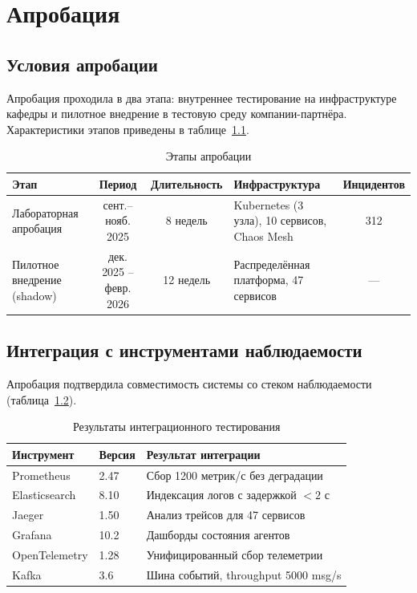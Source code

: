 \chapter{Апробация}

\section{Условия апробации}

Апробация проходила в два этапа: внутреннее тестирование на инфраструктуре кафедры и пилотное внедрение в тестовую среду компании-партнёра. Характеристики этапов приведены в таблице~\ref{tab:aprobation_stages}.

\begin{table}[H]
\centering
\caption{Этапы апробации}
\label{tab:aprobation_stages}
\begin{tabular}{|p{4cm}|c|c|p{5.5cm}|c|}
\hline
\textbf{Этап} & \textbf{Период} & \textbf{Длительность} & \textbf{Инфраструктура} & \textbf{Инцидентов} \\
\hline
Лабораторная апробация & сент.--нояб. 2025 & 8 недель & Kubernetes (3 узла), 10 сервисов, Chaos Mesh & 312 \\
\hline
Пилотное внедрение (shadow) & дек. 2025 -- февр. 2026 & 12 недель & Распределённая платформа, 47 сервисов & --- \\
\hline
\end{tabular}
\end{table}

\section{Интеграция с инструментами наблюдаемости}

Апробация подтвердила совместимость системы со стеком наблюдаемости (таблица~\ref{tab:integration_results}).

\begin{table}[H]
\centering
\caption{Результаты интеграционного тестирования}
\label{tab:integration_results}
\begin{tabular}{|p{3.5cm}|p{4cm}|p{5cm}|}
\hline
\textbf{Инструмент} & \textbf{Версия} & \textbf{Результат интеграции} \\
\hline
Prometheus & 2.47 & Сбор 1200 метрик/с без деградации \\
\hline
Elasticsearch & 8.10 & Индексация логов с задержкой $< 2$ с \\
\hline
Jaeger & 1.50 & Анализ трейсов для 47 сервисов \\
\hline
Grafana & 10.2 & Дашборды состояния агентов \\
\hline
OpenTelemetry & 1.28 & Унифицированный сбор телеметрии \\
\hline
Kafka & 3.6 & Шина событий, throughput 5000 msg/s \\
\hline
\end{tabular}
\end{table}

